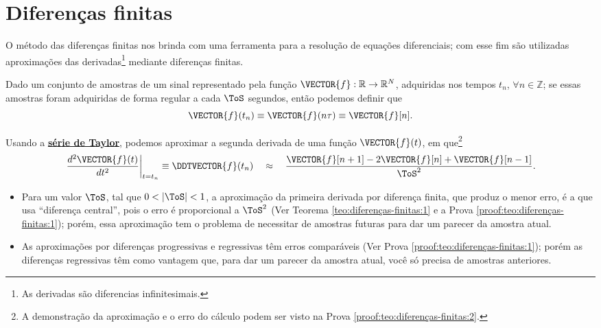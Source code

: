 \section{Diferenças finitas}

O método das diferenças finitas nos brinda com uma ferramenta para a resolução de 
equações diferenciais; com esse fim são utilizadas aproximações das derivadas\footnote{As 
derivadas são diferencias infinitesimais.} 
mediante diferenças finitas.

\begin{definition}
\label{def:diferenças-finitas:0}
Dado um conjunto de amostras de um sinal representado pela função $\VECTOR{f}: \mathbb{R} \rightarrow \mathbb{R}^N$, 
adquiridas nos  tempos $t_n$, $\forall n \in \mathbb{Z}$; 
se essas amostras foram adquiridas de forma regular a cada $\ToS$ segundos,
então podemos definir que
\begin{equation}
\VECTOR{f}(t_n)\equiv \VECTOR{f}(n\tau) \equiv \VECTOR{f}[n].
\end{equation}
\end{definition}

\begin{theorem}
\label{teo:diferenças-finitas:2}
Usando a \hyperref[def:taylor]{\textbf{série de Taylor}}, podemos aproximar 
a segunda derivada de uma função $\VECTOR{f}(t)$, em que\footnote{A
demonstração da aproximação e o erro do cálculo podem ser visto na Prova \ref{proof:teo:diferenças-finitas:2}.}
\begin{equation}
\left.\frac{d^2\VECTOR{f}(t)}{dt^2}\right|_{t=t_n}\equiv \DDTVECTOR{f}(t_n)
\quad \approx \quad
\frac{\VECTOR{f}[n+1]-2\VECTOR{f}[n]+\VECTOR{f}[n-1]}{\ToS^2}.
\end{equation}
\end{theorem}

\begin{tcbattention}
\begin{itemize}
\item Para um valor $\ToS$, tal que $0<|\ToS|<1$, a aproximação da primeira derivada por diferença finita, 
que produz o menor erro, é a que usa ``diferença central'', pois o erro é proporcional a ${\ToS}^2$ 
(Ver Teorema \ref{teo:diferenças-finitas:1}
e a Prova \ref{proof:teo:diferenças-finitas:1}); porém, 
essa aproximação tem o problema de necessitar de amostras futuras para dar um parecer da amostra atual.
\item As aproximações por diferenças progressivas e regressivas têm erros comparáveis
 (Ver Prova \ref{proof:teo:diferenças-finitas:1});
porém as diferenças regressivas têm como vantagem que, para dar um parecer da amostra atual,
você só precisa de amostras anteriores.
\end{itemize}
\end{tcbattention}



